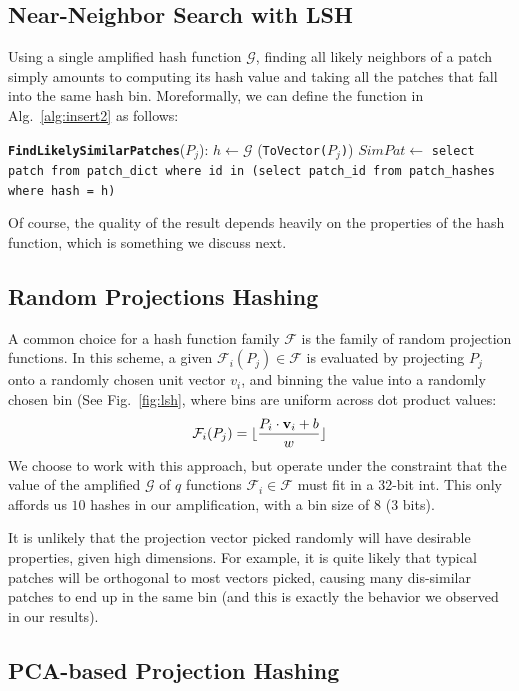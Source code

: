 \subsection{Near-Neighbor Search with LSH}\label{ssec:nn-lsh}

Using a single amplified hash function $\mathcal{G}$, finding
all likely neighbors of a patch simply amounts to computing
its hash value and taking all the patches that fall into the
same hash bin.
Moreformally, we can define the function
in Alg.~\ref{alg:insert2} as follows:
\begin{algorithmic}[1]
\Statex \texttt{\textbf{FindLikelySimilarPatches}}($P_j$):
\State $h \leftarrow \mathcal{G}$ (\texttt{ToVector($P_j$)})
\State $SimPat \leftarrow$ \texttt{select patch from patch\_dict where id in
(select patch\_id from patch\_hashes where hash = h)}
\end{algorithmic}
Of course, the quality of the result depends heavily on the
properties of the hash function, which is something we discuss next.

\subsection{Random Projections Hashing}\label{ssec:naive-nn}

A common choice for a hash function family $\mathcal{F}$ is
the family of random projection functions. In this scheme,
a given $\mathcal{F}_i(P_j) \in \mathcal{F}$ is evaluated by
projecting $P_j$ onto a randomly chosen unit vector $v_i$,
and binning the value into a randomly chosen bin (See Fig.~\ref{fig:lsh},
where bins are uniform across dot product values:
\begin{equation}
\mathcal{F}_i(P_j) = \lfloor\frac{P_i \cdot \mathbf{v}_i + b}{w}\rfloor
\end{equation}
We choose to work with this approach, but operate under
the constraint that the value of the amplified $\mathcal{G}$ of $q$
functions $\mathcal{F}_i \in \mathcal{F}$ must fit in a 32-bit int.
This only affords us $10$ hashes in our amplification,
with a bin size of $8$ (3 bits).

It is unlikely that the projection vector picked randomly
will have desirable properties, given high dimensions. For example,
it is quite likely that typical patches will be orthogonal to
most vectors picked, causing many dis-similar patches to
end up in the same bin (and this is exactly the behavior
we observed in our results).

\subsection{PCA-based Projection Hashing}\label{ssec:pca-nn}

